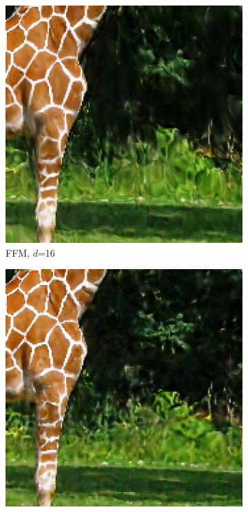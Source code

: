 \begin{figure}[!h]
    
    \begin{subfigure}{.25\textwidth}
      \includegraphics[width=\textwidth]{Bilder/Giraffe/Bildausschnitte/image_result_fourier12000_indim16_lr0.0125.eps}
      \caption{FFM, $d$=16}
      \label{FFM16}
    \end{subfigure}\hfil
    \begin{subfigure}{.25\textwidth}
      \includegraphics[width=\textwidth]{Bilder/Giraffe/Bildausschnitte/image_result_positional12000_indim16_lr0.003333.eps}

\end{subfigure}
\end{figure}
